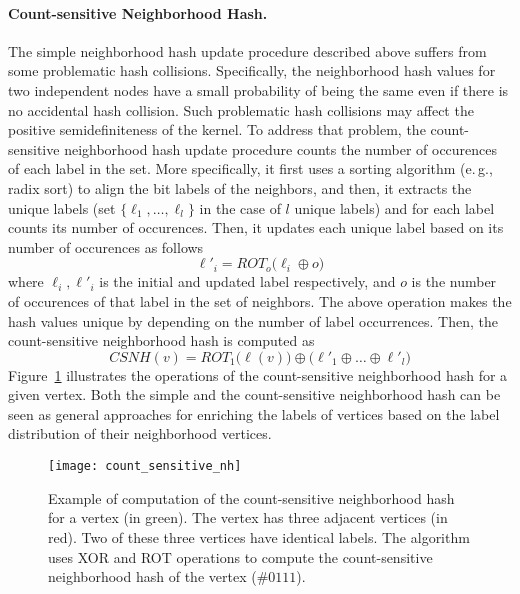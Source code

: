 \documentclass[twoside,11pt]{article}
\newcommand{\eg}{e.\,g., }
\begin{document}
\paragraph{Count-sensitive Neighborhood Hash.}
The simple neighborhood hash update procedure described above suffers from some problematic hash collisions.
Specifically, the neighborhood hash values for two independent nodes have a small probability of being the same even if there is no accidental hash collision.
Such problematic hash collisions may affect the positive semidefiniteness of the kernel.
To address that problem, the count-sensitive neighborhood hash update procedure counts the number of occurences of each label in the set.
More specifically, it first uses a sorting algorithm (\eg radix sort) to align the bit labels of the neighbors, and then, it extracts the unique labels (set $\{ \ell_1, \ldots, \ell_l \}$ in the case of $l$ unique labels) and for each label counts its number of occurences.
Then, it updates each unique label based on its number of occurences as follows
\begin{equation}
    \ell'_i = ROT_o \big( \ell_i \oplus o \big)
\end{equation}
where $\ell_i, \ell'_i$ is the initial and updated label respectively, and $o$ is the number of occurences of that label in the set of neighbors.
The above operation makes the hash values unique by depending on the number of label occurrences.
Then, the count-sensitive neighborhood hash is computed as
\begin{equation}
    CSNH(v) = ROT_1 \big( \ell(v) \big) \oplus \big( \ell'_1 \oplus \ldots \oplus \ell'_l \big)
\end{equation}
Figure~\ref{fig:count_sensitive_nh} illustrates the operations of the count-sensitive neighborhood hash for a given vertex.
Both the simple and the count-sensitive neighborhood hash can be seen as general approaches for enriching the labels of vertices based on the label distribution of their neighborhood vertices.

\begin{figure}[t]
  \centering
  \texttt{[image: count\_sensitive\_nh]}
  \caption{Example of computation of the count-sensitive neighborhood hash for a vertex (in green). The vertex has three adjacent vertices (in red). Two of these three vertices have identical labels. The algorithm uses XOR and ROT operations to compute the count-sensitive neighborhood hash of the vertex ($\#0111$).}
  \label{fig:count_sensitive_nh}
\end{figure}
\end{document}
